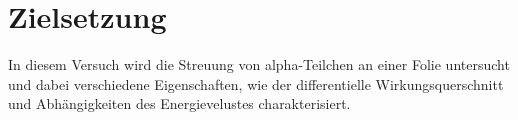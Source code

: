 \section{Zielsetzung}

\label{sec:Zielsetzung}
In diesem Versuch wird die Streuung von alpha-Teilchen an einer Folie untersucht und dabei verschiedene Eigenschaften, wie
der differentielle Wirkungsquerschnitt und Abhängigkeiten des Energievelustes charakterisiert.
